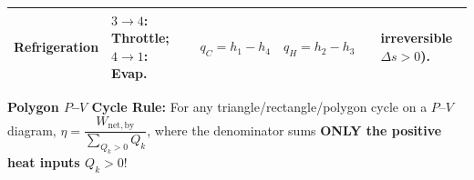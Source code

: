 \documentclass[10pt,twoside,openany,letterpaper]{book}
\begin{document}
\begin{quicksheet}
\begin{formulacard}
\begin{tabularx}{\linewidth}{@{}l l l l l X@{}}
\textbf{Refrigeration} & $3\to 4$: Throttle; $4\to 1$: Evap. & $q_C = h_1 - h_4$ & $q_H = h_2 - h_3$ & & irreversible $\Delta s > 0$). \\
\bottomrule
\end{tabularx}
\par\smallskip\noindent
\textbf{Polygon $P$--$V$ Cycle Rule:} For any triangle/rectangle/polygon cycle on a $P$--$V$ diagram, $\eta = \dfrac{W_{\mathrm{net,by}}}{\sum_{Q_k > 0} Q_k}$, where the denominator sums \textbf{ONLY the positive heat inputs $Q_k > 0$}!
\end{formulacard}
\end{quicksheet}

\end{document}
